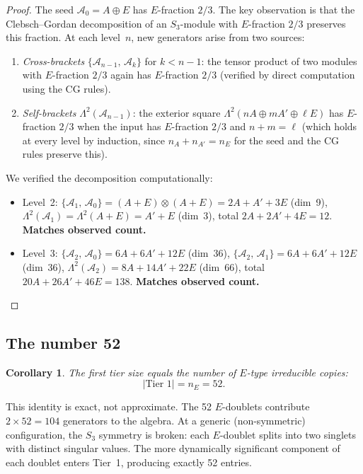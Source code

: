 \documentclass[11pt,a4paper]{article}
\newtheorem{corollary}[theorem]{Corollary}
\theoremstyle{remark}
\newcommand{\pb}[2]{\{#1,\,#2\}}
\newcommand{\cA}{\mathcal{A}}
\newcommand{\SG}{S_3}
\begin{document}
\begin{proof}
The seed $\cA_0 = A \oplus E$ has $E$-fraction $2/3$.
The key observation is that the Clebsch--Gordan
decomposition of an $\SG$-module with $E$-fraction $2/3$
preserves this fraction.  At each level~$n$, new
generators arise from two sources:
\begin{enumerate}[nosep]
  \item \emph{Cross-brackets} $\pb{\cA_{n-1}}{\cA_k}$
    for $k < n-1$: the tensor product of two modules
    with $E$-fraction $2/3$ again has $E$-fraction $2/3$
    (verified by direct computation using the CG rules).
  \item \emph{Self-brackets} $\Lambda^2(\cA_{n-1})$:
    the exterior square $\Lambda^2(nA \oplus mA' \oplus
    \ell E)$ has $E$-fraction $2/3$ when the input has
    $E$-fraction $2/3$ and $n + m = \ell$ (which holds at
    every level by induction, since $n_A + n_{A'} = n_E$
    for the seed and the CG rules preserve this).
\end{enumerate}
We verified the decomposition computationally:
\begin{itemize}[nosep]
  \item Level~2:
    $\pb{\cA_1}{\cA_0} = (A{+}E) \otimes (A{+}E)
    = 2A + A' + 3E$ (dim~9),
    $\Lambda^2(\cA_1) = \Lambda^2(A{+}E) = A' + E$
    (dim~3), total $2A + 2A' + 4E = 12$.
    \textbf{Matches observed count.}
  \item Level~3:
    $\pb{\cA_2}{\cA_0} = 6A + 6A' + 12E$ (dim~36),
    $\pb{\cA_2}{\cA_1} = 6A + 6A' + 12E$ (dim~36),
    $\Lambda^2(\cA_2) = 8A + 14A' + 22E$ (dim~66),
    total $20A + 26A' + 46E = 138$.
    \textbf{Matches observed count.}
    \qedhere
\end{itemize}
\end{proof}

\subsection{The number 52}

\begin{corollary}
\label{cor:52}
The first tier size equals the number of $E$-type
irreducible copies:
\[
  |\text{Tier 1}| = n_E = 52.
\]
\end{corollary}

This identity is exact, not approximate.  The 52
$E$-doublets contribute $2 \times 52 = 104$ generators
to the algebra.  At a generic (non-symmetric)
configuration, the $\SG$ symmetry is broken: each
$E$-doublet splits into two singlets with distinct
singular values.  The more dynamically significant
component of each doublet enters Tier~1, producing
exactly 52 entries.
\end{document}
